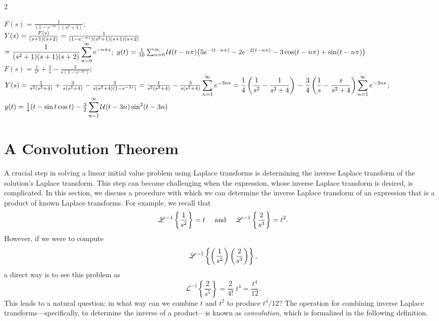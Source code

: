 \begin{multicols}{2}
\begin{Answer}[ref={EX74}]
\begin{tasks}[resume=false]
			\task $F(s) = \frac{1}{(1-e^{-\pi  s})(s^2+1)}$; \\$Y(s) = \frac{F(s)}{(s+1)(s+2)}\\ =\frac{1}{(1-e^{-\pi  s})(s^2+1)(s+1)(s+2)} $\\$=\displaystyle\frac{1}{(s^2+1)(s+1)(s+2)}\sum_{n=0}^\infty e^{-n\pi s} $;
			$y(t) = \frac{1}{10}\sum_{n=0}^\infty \mathcal{U}(t- n\pi)\\ \big( 5e^{-(t-n\pi)}- 2 e^{-2(t-n\pi)}\\
			-3 \cos(t-n\pi)+\sin (t-n\pi)\big)$
			\task $F(s) = \frac{1}{s^2}+\frac{3}{s}-\frac{3}{s(1-e^{-3s})}$;  $Y(s)  = \frac{1}{s^2(s^2+4)}+\frac{3}{s(s^2+4)}-\frac{3}{s (s^2+4)(1-e^{-3s})} =\frac{1}{s^2(s^2+4)} -\frac{3}{s(s^2+4)}\displaystyle\sum_{n=1}^\infty  e^{-3ns}\\
			=\frac{1}{4}\left(\frac{1}{s^2} - \frac{1}{s^2+4}\right)\\ -\frac{3}{4}\left(\frac{1}{s}-\frac{s}{s^2+4}\right)\displaystyle\sum_{n=1}^\infty  e^{-3ns}$;\\
			$ y(t) = \frac{1}{4} ( t- \sin t \cos t)\\- \frac{3}{2} \displaystyle\sum_{n=1}^\infty \mathcal{U}(t-3n) \sin^2(t-3n)$
		\end{tasks} 
	\end{Answer}
\end{multicols}

\section{A Convolution Theorem}
A crucial step in solving a linear initial value problem using Laplace transforms is determining the inverse Laplace transform of the solution's Laplace transform. This step can become challenging when the expression, whose inverse Laplace transform is desired, is complicated. In this section, we discuss a procedure with which we can determine the inverse Laplace transform of an expression that is  a product of  known Laplace  transforms. For example, we recall that \[\mathscr{L}^{-1}\left\{\displaystyle\frac{1}{s^2}\right\} = t \quad \text{ and }\quad  \mathscr{L}^{-1}\left\{\displaystyle\frac{2}{s^3}\right\} = t^2.\]
However, if we were to compute   
\[ \mathscr{L}^{-1}\left\{\displaystyle\left(\frac{1}{s^2}\right) \left(\frac{2}{s^3}\right)\right\},\] a direct way is to see this problem as
\[ \mathscr{L}^{-1}\left\{\frac{2}{s^5}\right\} = \frac{2}{4!}\; t^4 = \frac{t^4}{12}.\]
This leads to a natural question: in what way can we combine $t$ and $t^2$ to produce $t^4/12$? The  operation for combining inverse Laplace transforms—specifically, to determine the inverse of a product—is known as \textit{convolution}, which is formalized in the following definition.


